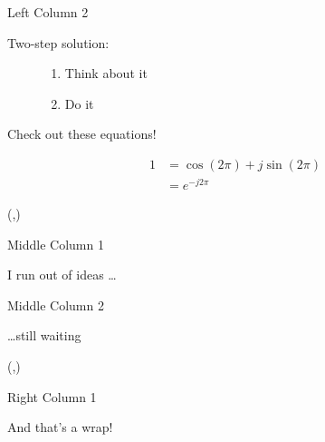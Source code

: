 \documentclass[final]{beamer}
\begin{document}
\begin{frame}[fragile]{}
\begin{textblock}{\lcolwidth}
\begin{paddedBlock}{Left Column 2}
\begin{description}
\item[Two-step solution:]\hfill
    \begin{enumerate}
    \item Think about it
    \item Do it
    \end{enumerate}
\end{description}

\vspace{1cm}

\alert{Check out these equations!}

\begin{align}
1 &= \cos(2\pi) + j\sin(2\pi) \\
  &= e^{-j2\pi}
\end{align}

\end{paddedBlock}


\end{textblock}



\begin{textblock}{\mcolwidth}(\secondcolpos,\vstartCols)

\begin{paddedBlock}{Middle Column 1}

I run out of ideas \ldots

\end{paddedBlock}

\begin{paddedBlock}{Middle Column 2}

\ldots still waiting

\end{paddedBlock}


\end{textblock}


\begin{textblock}{\rcolwidth}(\thirdcolpos,\vstartCols)


\begin{paddedBlock}{Right Column 1}

And that's a wrap!

\end{paddedBlock}





\end{textblock}
\end{frame}
\end{document}
